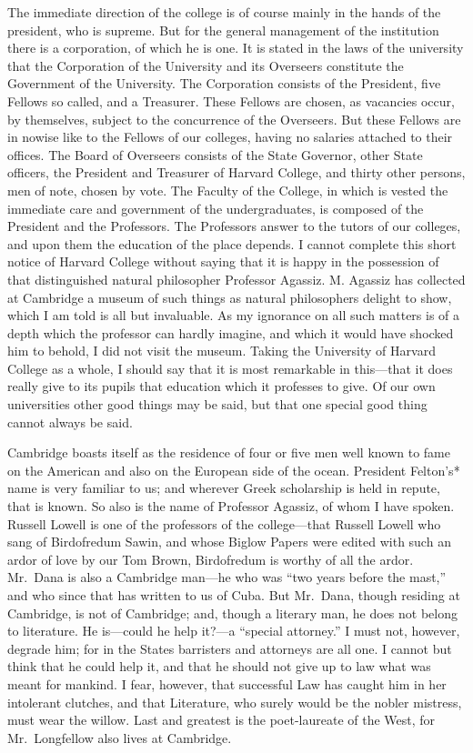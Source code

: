 The immediate direction of the college is of course mainly in the
hands of the president, who is supreme.  But for the general
management of the institution there is a corporation, of which he
is one.  It is stated in the laws of the university that the
Corporation of the University and its Overseers constitute the
Government of the University.  The Corporation consists of the
President, five Fellows so called, and a Treasurer.  These Fellows
are chosen, as vacancies occur, by themselves, subject to the
concurrence of the Overseers.  But these Fellows are in nowise like
to the Fellows of our colleges, having no salaries attached to
their offices.  The Board of Overseers consists of the State
Governor, other State officers, the President and Treasurer of
Harvard College, and thirty other persons, men of note, chosen by
vote.  The Faculty of the College, in which is vested the immediate
care and government of the undergraduates, is composed of the
President and the Professors.  The Professors answer to the tutors
of our colleges, and upon them the education of the place depends.
I cannot complete this short notice of Harvard College without
saying that it is happy in the possession of that distinguished
natural philosopher Professor Agassiz.  M. Agassiz has collected at
Cambridge a museum of such things as natural philosophers delight
to show, which I am told is all but invaluable.  As my ignorance on
all such matters is of a depth which the professor can hardly
imagine, and which it would have shocked him to behold, I did not
visit the museum.  Taking the University of Harvard College as a
whole, I should say that it is most remarkable in this---that it
does really give to its pupils that education which it professes to
give.  Of our own universities other good things may be said, but
that one special good thing cannot always be said.

Cambridge boasts itself as the residence of four or five men well
known to fame on the American and also on the European side of the
ocean.  President Felton's* name is very familiar to us; and
wherever Greek scholarship is held in repute, that is known.  So
also is the name of Professor Agassiz, of whom I have spoken.
Russell Lowell is one of the professors of the college---that
Russell Lowell who sang of Birdofredum Sawin, and whose Biglow
Papers were edited with such an ardor of love by our Tom Brown,
Birdofredum is worthy of all the ardor.  Mr.\ Dana is also a
Cambridge man---he who was ``two years before the mast,'' and who
since that has written to us of Cuba.  But Mr.\ Dana, though
residing at Cambridge, is not of Cambridge; and, though a literary
man, he does not belong to literature.  He is---could he help it?---a
``special attorney.''  I must not, however, degrade him; for in the
States barristers and attorneys are all one.  I cannot but think
that he could help it, and that he should not give up to law what
was meant for mankind.  I fear, however, that successful Law has
caught him in her intolerant clutches, and that Literature, who
surely would be the nobler mistress, must wear the willow.  Last
and greatest is the poet-laureate of the West, for Mr.\ Longfellow
also lives at Cambridge.


